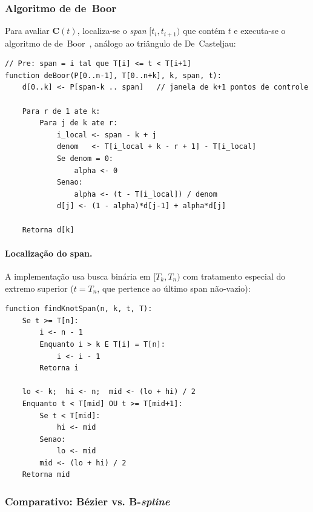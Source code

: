 \documentclass[12pt, a4paper]{article}
\theoremstyle{remark}
\begin{document}
\subsubsection{Algoritmo de de~Boor}

Para avaliar $\mathbf{C}(t)$, localiza-se o \emph{span} $[t_i, t_{i+1})$
que contém $t$ e executa-se o algoritmo de de~Boor~\cite{deboor1972},
análogo ao triângulo de De~Casteljau:

\begin{lstlisting}[language=Pseudocode, caption={Algoritmo de de~Boor, avaliação de $\mathbf{C}(t)$.}]
// Pre: span = i tal que T[i] <= t < T[i+1]
function deBoor(P[0..n-1], T[0..n+k], k, span, t):
    d[0..k] <- P[span-k .. span]   // janela de k+1 pontos de controle

    Para r de 1 ate k:
        Para j de k ate r:
            i_local <- span - k + j
            denom   <- T[i_local + k - r + 1] - T[i_local]
            Se denom = 0:
                alpha <- 0
            Senao:
                alpha <- (t - T[i_local]) / denom
            d[j] <- (1 - alpha)*d[j-1] + alpha*d[j]

    Retorna d[k]
\end{lstlisting}

\paragraph{Localização do span.}

A implementação usa busca binária em $[T_k, T_n)$ com tratamento especial
do extremo superior ($t = T_n$, que pertence ao último span não-vazio):

\begin{lstlisting}[language=Pseudocode, caption={Localização do span por busca binária.}]
function findKnotSpan(n, k, t, T):
    Se t >= T[n]:
        i <- n - 1
        Enquanto i > k E T[i] = T[n]:
            i <- i - 1
        Retorna i

    lo <- k;  hi <- n;  mid <- (lo + hi) / 2
    Enquanto t < T[mid] OU t >= T[mid+1]:
        Se t < T[mid]:
            hi <- mid
        Senao:
            lo <- mid
        mid <- (lo + hi) / 2
    Retorna mid
\end{lstlisting}

\subsubsection{Comparativo: Bézier vs. B-\emph{spline}}
\end{document}
